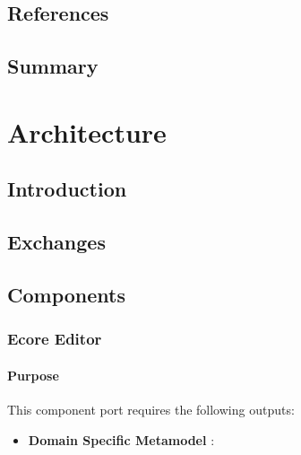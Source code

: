 \documentclass{gemoc} %
\begin{document}
\section{References}


\section{Summary}

 
\chapter{Architecture}


\section{Introduction}


\section{Exchanges}


\section{Components}

\subsection{Ecore Editor}


\subsubsection{Purpose}


This component port requires the following outputs:
\begin{itemize}
  \item \textbf{Domain Specific Metamodel} :
\end{itemize}
\end{document}
